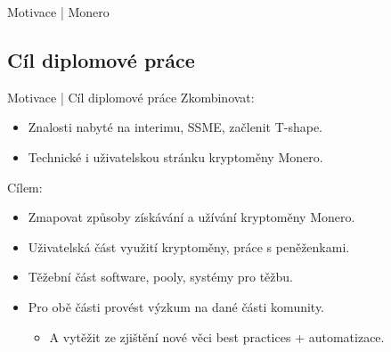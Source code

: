 \documentclass{beamer}
\begin{document}
\begin{darkframes}
\begin{frame}{Motivace | Monero}
    \end{frame}
    \subsection{Cíl diplomové práce}
    \begin{frame}{Motivace | Cíl diplomové práce}
     Zkombinovat:
     \begin{itemize}
     \item Znalosti nabyté na interimu, SSME, začlenit T-shape.
     \item Technické i uživatelskou stránku kryptoměny Monero.
     \end{itemize}
     	Cílem:
		\begin{itemize}
		\item Zmapovat způsoby získávání a užívání kryptoměny Monero.
		\item Uživatelská část \textemdash  využití kryptoměny, práce s peněženkami.
		\item Těžební část \textemdash  software, pooly, systémy pro těžbu.
		\item Pro obě části \textemdash  provést výzkum na dané části komunity.
		\begin{itemize}
		\item A vytěžit ze zjištění nové věci \textemdash  best practices + automatizace.
		\end{itemize}
		\end{itemize}
    \end{frame}
  \end{darkframes}

    
\end{document}
